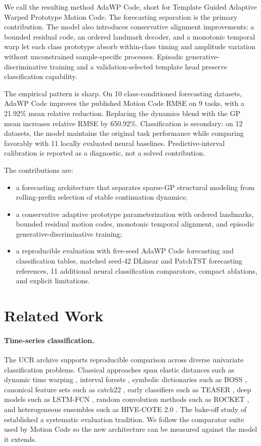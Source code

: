\documentclass[11pt]{article}
\newcommand{\method}{AdaWP Code}
\newcommand{\mc}{Motion Code}
\begin{document}
We call the resulting method \method{}, short for Template Guided Adaptive Warped Prototype Motion Code. The forecasting separation is the primary contribution. The model also introduces conservative alignment improvements: a bounded residual code, an ordered landmark decoder, and a monotonic temporal warp let each class prototype absorb within-class timing and amplitude variation without unconstrained sample-specific processes. Episodic generative-discriminative training and a validation-selected template head preserve classification capability.

The empirical pattern is sharp. On 10 class-conditioned forecasting datasets, \method{} improves the published \mc{} RMSE on 9 tasks, with a 21.92\% mean relative reduction. Replacing the dynamics blend with the GP mean increases relative RMSE by 650.92\%. Classification is secondary: on 12 datasets, the model maintains the original task performance while comparing favorably with 11 locally evaluated neural baselines. Predictive-interval calibration is reported as a diagnostic, not a solved contribution.

The contributions are:
\begin{itemize}
  \item a forecasting architecture that separates sparse-GP structural modeling from rolling-prefix selection of stable continuation dynamics;
  \item a conservative adaptive prototype parameterization with ordered landmarks, bounded residual motion codes, monotonic temporal alignment, and episodic generative-discriminative training;
  \item a reproducible evaluation with five-seed \method{} forecasting and classification tables, matched seed-42 DLinear and PatchTST forecasting references, 11 additional neural classification comparators, compact ablations, and explicit limitations.
\end{itemize}

\section{Related Work}

\paragraph{Time-series classification.}
The UCR archive \citep{dau2019ucr} supports reproducible comparison across diverse univariate classification problems. Classical approaches span elastic distances such as dynamic time warping \citep{keogh2005dtw}, interval forests \citep{deng2013tsf}, symbolic dictionaries such as BOSS \citep{schaefer2015boss}, canonical feature sets such as catch22 \citep{lubba2019catch22}, early classifiers such as TEASER \citep{schaefer2020teaser}, deep models such as LSTM-FCN \citep{karim2018lstmfcn}, random convolution methods such as ROCKET \citep{dempster2020rocket}, and heterogeneous ensembles such as HIVE-COTE 2.0 \citep{middlehurst2021hivecote}. The bake-off study of \citet{bagnall2017bakeoff} established a systematic evaluation tradition. We follow the comparator suite used by \mc{} so the new architecture can be measured against the model it extends.
\end{document}
